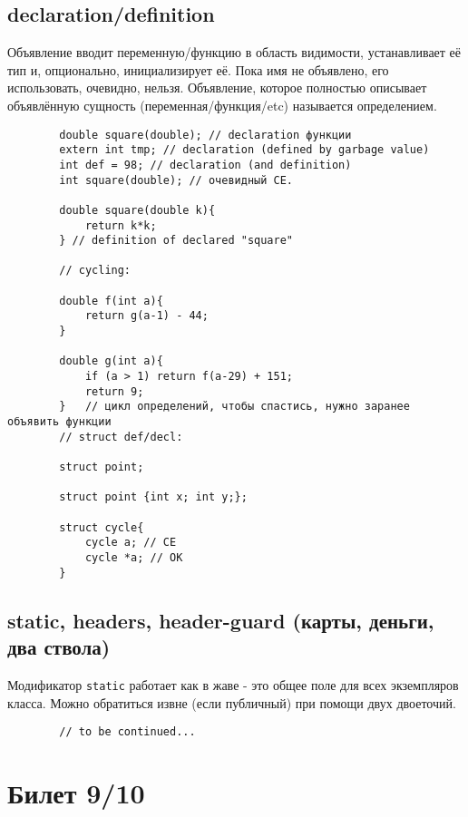 \documentclass[15pt, a4paper]{article}
\begin{document}
    \subsection{declaration/definition}
    Объявление вводит переменную/функцию в область видимости, устанавливает её тип и, опционально, инициализирует её.
    Пока имя не объявлено, его использовать, очевидно, нельзя. Объявление, которое полностью описывает объявлённую сущность (переменная/функция/etc) называется определением.
    \begin{verbatim}
        double square(double); // declaration функции
        extern int tmp; // declaration (defined by garbage value)
        int def = 98; // declaration (and definition)
        int square(double); // очевидный CE.
        
        double square(double k){
            return k*k;
        } // definition of declared "square"

        // cycling:

        double f(int a){
            return g(a-1) - 44;
        }

        double g(int a){
            if (a > 1) return f(a-29) + 151;
            return 9;
        }   // цикл определений, чтобы спастись, нужно заранее объявить функции
        // struct def/decl:

        struct point;

        struct point {int x; int y;};

        struct cycle{
            cycle a; // CE
            cycle *a; // OK
        }
    \end{verbatim}
    \subsection{static, headers, header-guard (карты, деньги, два ствола)}
    Модификатор \texttt{static} работает как в жаве - это общее поле для всех экземпляров класса. Можно обратиться извне (если публичный) при помощи двух двоеточий.
    \begin{verbatim}
        // to be continued...
    \end{verbatim}
    \section{Билет 9/10}
\end{document}
